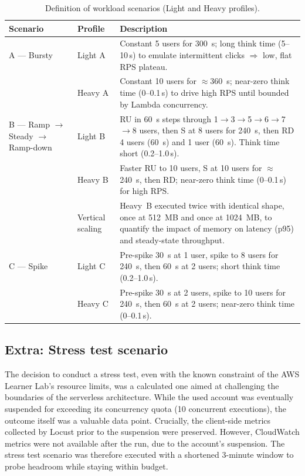 \documentclass[11pt,a4paper]{article}
\begin{document}
\begin{table}[h]
\centering
\renewcommand{\arraystretch}{1.3}
\begin{tabular}{|p{2cm}|p{2cm}|p{10cm}|}
\hline
\textbf{Scenario} & \textbf{Profile} & \textbf{Description} \\
\hline

A — Bursty &
Light A &
Constant 5 users for \SI{300}{s}; long think time (5–10\,s) to emulate intermittent clicks $\Rightarrow$ low, flat RPS plateau. \\
\cline{2-3}
& Heavy A &
Constant 10 users for $\approx$\SI{360}{s}; near-zero think time (0–0.1\,s) to drive high RPS until bounded by Lambda concurrency. \\
\hline

B — Ramp $\rightarrow$ Steady $\rightarrow$ Ramp-down &
Light B &
RU in \SI{60}{s} steps through 1$\rightarrow$3$\rightarrow$5$\rightarrow$6$\rightarrow$7$\rightarrow$8 users, then S at 8 users for \SI{240}{s}, then RD 4 users (\SI{60}{s}) and 1 user (\SI{60}{s}). Think time short (0.2–1.0\,s). \\
\cline{2-3}
& Heavy B &
Faster RU to 10 users, S at 10 users for $\approx$\SI{240}{s}, then RD; near-zero think time (0–0.1\,s) for high RPS. \\
\cline{2-3}
& Vertical scaling &
Heavy~B executed twice with identical shape, once at \SI{512}{MB} and once at \SI{1024}{MB}, to quantify the impact of memory on latency (p95) and steady-state throughput. \\
\hline

C — Spike &
Light C &
Pre-spike \SI{30}{s} at 1 user, spike to 8 users for \SI{240}{s}, then \SI{60}{s} at 2 users; short think time (0.2–1.0\,s). \\
\cline{2-3}
& Heavy C &
Pre-spike \SI{30}{s} at 2 users, spike to 10 users for \SI{240}{s}, then \SI{60}{s} at 2 users; near-zero think time (0–0.1\,s). \\
\hline

\end{tabular}
\caption{Definition of workload scenarios (Light and Heavy profiles).}
\end{table}

\subsection{Extra: Stress test scenario}
The decision to conduct a stress test, even with the known constraint of the AWS Learner Lab's resource limits, was a calculated one aimed at challenging the boundaries of the serverless architecture. While the used account was eventually suspended for exceeding its concurrency quota (10 concurrent executions), the outcome itself was a valuable data point. Crucially, the client-side metrics collected by Locust prior to the suspension were preserved. However, CloudWatch metrics were not available after the run, due to the account's suspension. The stress test scenario was therefore executed with a shortened 3-minute window to probe headroom while staying within budget.
\end{document}
